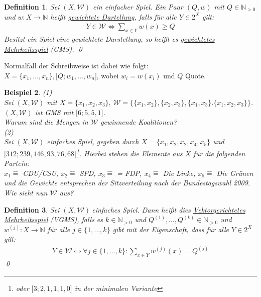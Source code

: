 \documentclass[ngerman]{scrartcl}
\theoremstyle{custom}
\newtheorem{mdef}{Definition} \numberwithin{mdef}{subsection}
\newtheorem{mex}[mdef]{Beispiel}
\newcommand{\0}{\mathbf{0}}
\newcommand{\1}{\mathbf{L}}
\newcommand{\sg}{$(X,\mathcal{W})~$}
\begin{document}
\begin{mdef}
Sei $(X, \mathcal{W})$ ein einfacher Spiel. Ein Paar $(Q, w)$ mit $Q
\in \mathds{N}_{>0}$ und $w: X \rightarrow \mathds{N}$ hei\ss t \underline{gewichtete
  Dartellung}, falls f\"ur alle $Y \in 2^X$ gilt:
\begin{align*}
Y \in \mathcal{W} \Leftrightarrow \sum_{x \in Y} w(x) \geq Q
\end{align*}
Besitzt ein Spiel eine gewichtete Darstellung, so hei\ss t es
\underline{gewichtetes Mehrheitsspiel} (GMS).
\qed
\end{mdef}
Normalfall der Schreibweise ist dabei wie folgt:\\
$X=\{x_1,\dots, x_n\}, \lbrack Q; w_1, \dots, w_n \rbrack$, wobei $w_i
= w(x_i)$ und $Q$ Quote.

\begin{mex}\label{mex:413}
(1)\\
Sei $(X,\mathcal{W})$ mit $X = \{x_1,x_2, x_3\}, ~ \mathcal{W} =
\{\{x_1,x_2\}, \{x_2,x_3\}, \{x_1,x_3\}.\{x_1,x_2,x_3\}\}$.\\
$(X,\mathcal{W})$ ist GMS mit $\lbrack 6;5,5,1\rbrack$.\\
Warum sind die Mengen in $\mathcal{W}$ gewinnende Koalitionen?\\

(2)\\
Sei $(X,\mathcal{W})$ einfaches Spiel, gegeben durch $X = \{ x_1, x_2,
x_2, x_4, x_5\}$ und $\lbrack 312; 239, 146, 93, 76, 68
\rbrack$\footnote{oder $\lbrack 3; 2, 1, 1, 1, 0 \rbrack$ in der
  minimalen Variante}. Hierbei stehen die Elemente aus $X$ f\"ur die
folgenden Partein:\\
$x_1 \mathrel{\widehat{=}}$  CDU/CSU, $x_2 \mathrel{\widehat{=}}$
SPD, $x_3 \mathrel{\widehat{=}}$  = FDP, $x_4 \mathrel{\widehat{=}}$
Die Linke, $x_5 \mathrel{\widehat{=}}$  Die Gr\"unen und die Gewichte
entsprechen der Sitzverteilung nach der Bundestagswahl 2009.\\
Wie sieht nun $\mathcal{W}$ aus?
\end{mex}

\begin{mdef}
Sei \sg einfaches Spiel. Dann hei\ss t dies
\underline{Vektorgerichtetes Mehrheitsspiel} (VGMS), falls es $k \in
\mathds{N}_{>0}$ und $Q^{(1)},\dots,Q^{(k)} \in \mathds{N}_{>0}$ und
$w^{(j)}: X \rightarrow \mathds{N}$ f\"ur alle $j \in \{1, \dots, k\}$
gibt mit der Eigenschaft, dass f\"ur alle $Y \in 2^X$ gilt:
\begin{align*}
Y \in \mathcal{W} \Leftrightarrow \forall j \in \{1, \dots, k\}:
\sum_{x \in Y} w^{(j)}(x) = Q^{(j)}
\end{align*}
\qed
\end{mdef}
\end{document}
